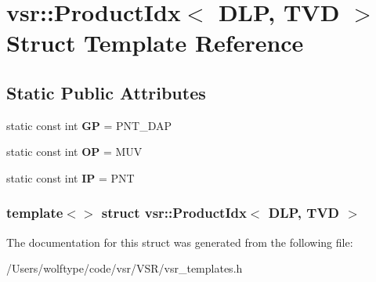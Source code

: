 \hypertarget{structvsr_1_1_product_idx_3_01_d_l_p_00_01_t_v_d_01_4}{\section{vsr\-:\-:Product\-Idx$<$ D\-L\-P, T\-V\-D $>$ Struct Template Reference}
\label{structvsr_1_1_product_idx_3_01_d_l_p_00_01_t_v_d_01_4}
}
\subsection*{Static Public Attributes}
\begin{DoxyCompactItemize}
\item 
\hypertarget{structvsr_1_1_product_idx_3_01_d_l_p_00_01_t_v_d_01_4_abd2a46a52e3bfea97ec5c8de9cdf027c}{static const int {\bfseries G\-P} = P\-N\-T\-\_\-\-D\-A\-P}\label{structvsr_1_1_product_idx_3_01_d_l_p_00_01_t_v_d_01_4_abd2a46a52e3bfea97ec5c8de9cdf027c}

\item 
\hypertarget{structvsr_1_1_product_idx_3_01_d_l_p_00_01_t_v_d_01_4_a760218c3de893042387ef5a8b8f04631}{static const int {\bfseries O\-P} = M\-U\-V}\label{structvsr_1_1_product_idx_3_01_d_l_p_00_01_t_v_d_01_4_a760218c3de893042387ef5a8b8f04631}

\item 
\hypertarget{structvsr_1_1_product_idx_3_01_d_l_p_00_01_t_v_d_01_4_a555d96de9e58b00e622c8fd92e688944}{static const int {\bfseries I\-P} = P\-N\-T}\label{structvsr_1_1_product_idx_3_01_d_l_p_00_01_t_v_d_01_4_a555d96de9e58b00e622c8fd92e688944}

\end{DoxyCompactItemize}
\subsubsection*{template$<$$>$ struct vsr\-::\-Product\-Idx$<$ D\-L\-P, T\-V\-D $>$}



The documentation for this struct was generated from the following file\-:\begin{DoxyCompactItemize}
\item 
/\-Users/wolftype/code/vsr/\-V\-S\-R/vsr\-\_\-templates.\-h\end{DoxyCompactItemize}
